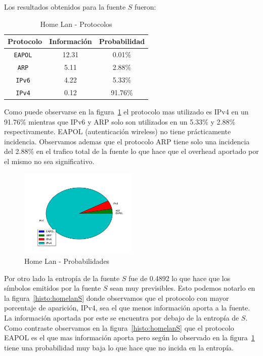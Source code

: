 \documentclass[final,inline,narroweqnarray,a4paper]{ieee}
\begin{document}
Los resultados obtenidos para la fuente $S$ fueron:

\begin{table}[H]
    \begin{center}
        \begin{tabular}{|c|c|c|}
            \hline
            \textbf{Protocolo} & \textbf{Información} & \textbf{Probabilidad} \\ \hline
            \texttt{EAPOL     }& 12.31       & 0.01\%     \\ \hline
            \texttt{ARP       }& 5.11        & 2.88\%     \\ \hline
            \texttt{IPv6      }& 4.22        & 5.33\%     \\ \hline
            \texttt{IPv4      }& 0.12        & 91.76\%    \\ \hline
        \end{tabular}
        \caption{Home Lan - Protocolos}
        \label{table:homelanS}
    \end{center}
\end{table}

Como puede observarse en la figura~\ref{torta:homelanS} el protocolo mas utilizado es IPv4 en un 91.76\% mientras que IPv6 y ARP solo son utilizados en un 5.33\% y 2.88\% respectivamente. EAPOL (autenticación wireless) no tiene prácticamente incidencia.
Observamos ademas que el protocolo ARP tiene solo una incidencia del 2.88\% en el trafico total de la fuente lo que hace que el overhead aportado por el mismo no sea significativo. 

\begin{figure}[H]
    \begin{center}
        \includegraphics[width=0.5\textwidth]{plot/homelanS-pie.png}
        \caption{Home Lan - Probabilidades}
        \label{torta:homelanS}
    \end{center}
\end{figure}

Por otro lado la entropía de la fuente $S$ fue de 0.4892 lo que hace que los símbolos emitidos por la fuente $S$ sean muy previsibles. Esto podemos notarlo en la figura~\ref{histo:homelanS} donde observamos que el protocolo con mayor porcentaje de aparición, IPv4,  sea el que menos información aporta a la fuente. La información aportada por este se encuentra por debajo de la entropía de $S$. Como contraste observamos en la figura~\ref{histo:homelanS} que el protocolo EAPOL es el que mas información aporta pero según lo observado en la figura~\ref{torta:homelanS} tiene una probabilidad muy baja lo que hace que no incida en la entropía.
\end{document}
